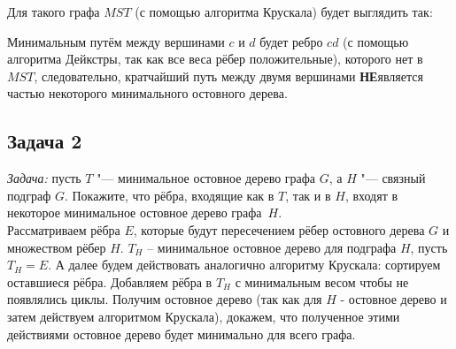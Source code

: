 \documentclass[a4paper,12pt]{article} %
\begin{document}
\begin{itemize}
Для такого графа $ MST $ (с помощью алгоритма Крускала) будет выглядить так:
\begin{center}
\end{center}
Минимальным путём между вершинами $ c $ и $ d $ будет ребро $ cd $ (с помощью алгоритма Дейкстры, так как все веса рёбер положительные), которого нет в $ MST $, следовательно, кратчайший путь между двумя вершинами \textbf{НЕ}является частью некоторого минимального остовного дерева.

\end{itemize}

\subsection*{Задача 2}
\textit{Задача:}  пусть $T$ "--- минимальное остовное дерево графа $G$, а $H$ "--- связный подграф $G$. Покажите, что рёбра, входящие как в $T$, так и в $H$, входят в некоторое минимальное остовное дерево графа~$H$.\\

Рассматриваем рёбра $ E $, которые будут пересечением рёбер остовного дерева $ G $ и множеством рёбер $ H $. $ T_H $ -- минимальное остовное дерево для подграфа $ H $, пусть $ T_H = E $. А далее будем действовать аналогично алгоритму Крускала: сортируем оставшиеся рёбра. Добавляем рёбра в $ T_H $  с минимальным весом чтобы не появлялись циклы. Получим остовное дерево (так как для $ H $ - остовное дерево и затем действуем алгоритмом Крускала), докажем, что полученное этими действиями остовное дерево будет минимально для всего графа.\\
\end{document}

